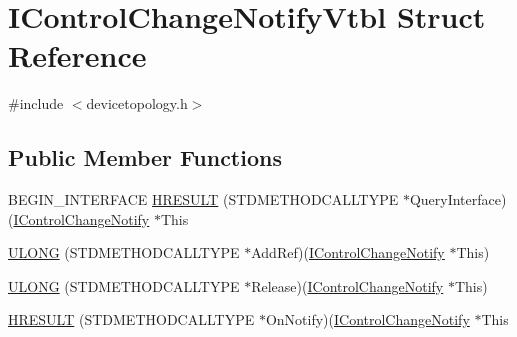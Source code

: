 \hypertarget{struct_i_control_change_notify_vtbl}{}\section{I\+Control\+Change\+Notify\+Vtbl Struct Reference}
\label{struct_i_control_change_notify_vtbl}


{\ttfamily \#include $<$devicetopology.\+h$>$}

\subsection*{Public Member Functions}
\begin{DoxyCompactItemize}
\item 
B\+E\+G\+I\+N\+\_\+\+I\+N\+T\+E\+R\+F\+A\+CE \hyperlink{struct_i_control_change_notify_vtbl_afbd46b0c5a504434b3cf56c9fbaf3f32}{H\+R\+E\+S\+U\+LT} (S\+T\+D\+M\+E\+T\+H\+O\+D\+C\+A\+L\+L\+T\+Y\+PE $\ast$Query\+Interface)(\hyperlink{devicetopology_8h_a214f342329b8752b5fbdd5f11db2ed43}{I\+Control\+Change\+Notify} $\ast$This
\item 
\hyperlink{struct_i_control_change_notify_vtbl_a48d6355114874087aa2e1a687d1ef5db}{U\+L\+O\+NG} (S\+T\+D\+M\+E\+T\+H\+O\+D\+C\+A\+L\+L\+T\+Y\+PE $\ast$Add\+Ref)(\hyperlink{devicetopology_8h_a214f342329b8752b5fbdd5f11db2ed43}{I\+Control\+Change\+Notify} $\ast$This)
\item 
\hyperlink{struct_i_control_change_notify_vtbl_a58dba833ef593895275e6986f280dfb4}{U\+L\+O\+NG} (S\+T\+D\+M\+E\+T\+H\+O\+D\+C\+A\+L\+L\+T\+Y\+PE $\ast$Release)(\hyperlink{devicetopology_8h_a214f342329b8752b5fbdd5f11db2ed43}{I\+Control\+Change\+Notify} $\ast$This)
\item 
\hyperlink{struct_i_control_change_notify_vtbl_a301ce21174a132629c85fbdc6435d779}{H\+R\+E\+S\+U\+LT} (S\+T\+D\+M\+E\+T\+H\+O\+D\+C\+A\+L\+L\+T\+Y\+PE $\ast$On\+Notify)(\hyperlink{devicetopology_8h_a214f342329b8752b5fbdd5f11db2ed43}{I\+Control\+Change\+Notify} $\ast$This
\end{DoxyCompactItemize}
